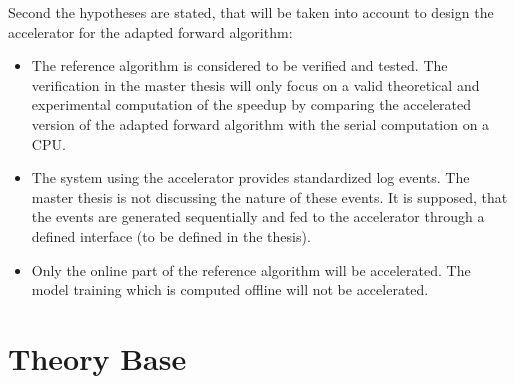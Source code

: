 \documentclass[12pt]{article} %
\begin{document}
Second the hypotheses are stated, that will be taken into account to design the
accelerator for the adapted forward algorithm:
\begin{itemize}
    \item The reference algorithm is considered to be verified and tested. The
        verification in the master thesis will only focus on a valid
        theoretical and experimental computation of the speedup by comparing the
        accelerated version of the adapted forward algorithm with the serial
        computation on a CPU.
    \item The system using the accelerator provides standardized log events.
        The master thesis is not discussing the nature of these events. It is
        supposed, that the events are generated sequentially and fed to the
        accelerator through a defined interface (to be defined in the thesis).
    \item Only the online part of the reference algorithm will be accelerated.
        The model training which is computed offline will not be accelerated.
\end{itemize}


\section{Theory Base} %
\end{document}

